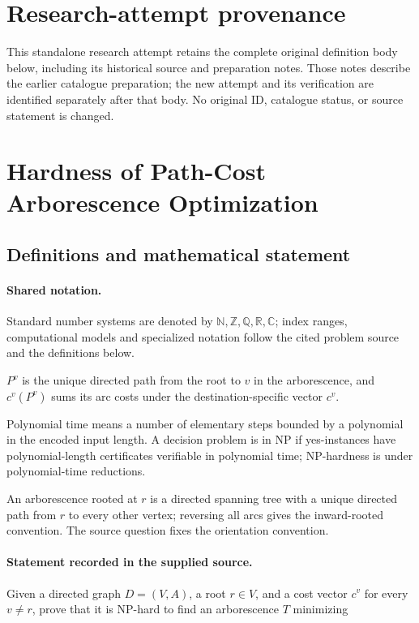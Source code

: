 \documentclass[11pt]{article}
\begin{document}
\section*{Research-attempt provenance}
This standalone research attempt retains the complete original definition body below,
including its historical source and preparation notes. Those notes describe the
earlier catalogue preparation; the new attempt and its verification are identified
separately after that body. No original ID, catalogue status, or source statement is changed.

\section{Hardness of Path-Cost Arborescence Optimization}\label{statement}

\subsection{Definitions and mathematical statement}

\paragraph{Shared notation.}Standard number systems are denoted by $\mathbb N,\mathbb Z,\mathbb Q,\mathbb R,\mathbb C$; index ranges, computational models and specialized notation follow the cited problem source and the definitions below.


$P^v$ is the unique directed path from the root to $v$ in the arborescence, and $c^v(P^v)$ sums its arc costs under the destination-specific vector $c^v$.

Polynomial time means a number of elementary steps bounded by a polynomial in the encoded input length. A decision problem is in $\mathrm{NP}$ if yes-instances have polynomial-length certificates verifiable in polynomial time; NP-hardness is under polynomial-time reductions.

An arborescence rooted at $r$ is a directed spanning tree with a unique directed path from $r$ to every other vertex; reversing all arcs gives the inward-rooted convention. The source question fixes the orientation convention.
\paragraph{Statement recorded in the supplied source.}
Given a directed graph $D=(V,A)$, a root $r\in V$, and a cost vector $c^v$ for every $v\neq r$, prove that it is NP-hard to find an arborescence $T$ minimizing
\end{document}
